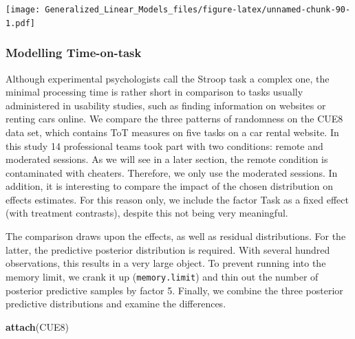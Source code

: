 \documentclass[]{svmono}
\newenvironment{Shaded}{\begin{snugshade}}{\end{snugshade}}
\newcommand{\KeywordTok}[1]{\textcolor[rgb]{0.13,0.29,0.53}{\textbf{#1}}}
\newcommand{\StringTok}[1]{\textcolor[rgb]{0.31,0.60,0.02}{#1}}
\newcommand{\OperatorTok}[1]{\textcolor[rgb]{0.81,0.36,0.00}{\textbf{#1}}}
\newcommand{\NormalTok}[1]{#1}
\theoremstyle{definition}
\theoremstyle{definition}
\theoremstyle{definition}
\theoremstyle{remark}
\begin{document}
\texttt{[image: Generalized\_Linear\_Models\_files/figure-latex/unnamed-chunk-90-1.pdf]}

\subsubsection{Modelling Time-on-task}\label{modelling-time-on-task}

Although experimental psychologists call the Stroop task a complex one,
the minimal processing time is rather short in comparison to tasks
usually administered in usability studies, such as finding information
on websites or renting cars online. We compare the three patterns of
randomness on the CUE8 data set, which contains ToT measures on five
tasks on a car rental website. In this study 14 professional teams took
part with two conditions: remote and moderated sessions. As we will see
in a later section, the remote condition is contaminated with cheaters.
Therefore, we only use the moderated sessions. In addition, it is
interesting to compare the impact of the chosen distribution on effects
estimates. For this reason only, we include the factor Task as a fixed
effect (with treatment contrasts), despite this not being very
meaningful.

The comparison draws upon the effects, as well as residual
distributions. For the latter, the predictive posterior distribution is
required. With several hundred observations, this results in a very
large object. To prevent running into the memory limit, we crank it up
(\texttt{memory.limit}) and thin out the number of posterior predictive
samples by factor 5. Finally, we combine the three posterior predictive
distributions and examine the differences.

\begin{Shaded}
\begin{Highlighting}[]
\KeywordTok{attach}\NormalTok{(CUE8)}
\end{Highlighting}
\end{Shaded}

\begin{Shaded}
\end{Shaded}
\end{document}
